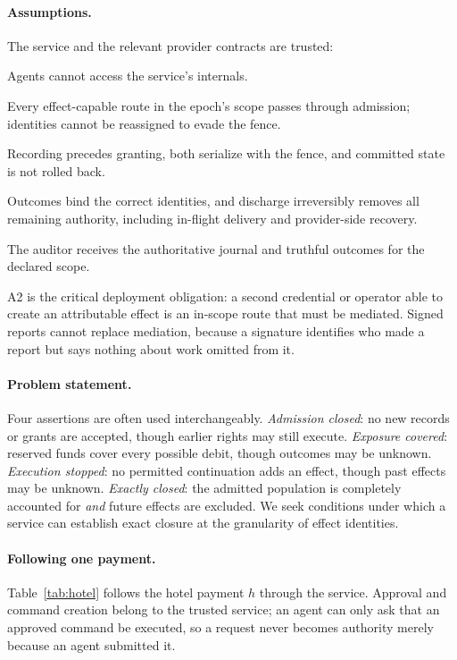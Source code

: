 \documentclass[runningheads]{llncs}
\begin{document}
\paragraph{Assumptions.}
The service and the relevant provider contracts are trusted:
\begin{description}[style=sameline,leftmargin=1.2em]
\item[A1 Request-only agents.] Agents cannot access the service's internals.
\item[A2 Complete mediation.] Every effect-capable route in the epoch's scope
passes through admission; identities cannot be reassigned to evade the fence.
\item[A3 Durable ordering.] Recording precedes granting, both serialize with the
fence, and committed state is not rolled back.
\item[A4 Truthful terminality.] Outcomes bind the correct identities, and
discharge irreversibly removes all remaining authority, including in-flight
delivery and provider-side recovery.
\item[A5 Faithful export.] The auditor receives the authoritative journal and
truthful outcomes for the declared scope.
\end{description}
A2 is the critical deployment obligation: a second credential or operator able
to create an attributable effect is an in-scope route that must be mediated.
Signed reports cannot replace mediation, because a signature identifies who
made a report but says nothing about work omitted from it.

\paragraph{Problem statement.}
Four assertions are often used interchangeably. \emph{Admission closed}: no new
records or grants are accepted, though earlier rights may still execute.
\emph{Exposure covered}: reserved funds cover every possible debit, though
outcomes may be unknown. \emph{Execution stopped}: no permitted continuation
adds an effect, though past effects may be unknown. \emph{Exactly closed}: the
admitted population is completely accounted for \emph{and} future effects are
excluded. We seek conditions under which a service can establish exact closure
at the granularity of effect identities.

\paragraph{Following one payment.}
Table~\ref{tab:hotel} follows the hotel payment $h$ through the service.
Approval and command creation belong to the trusted service; an agent can only
ask that an approved command be executed, so a request never becomes authority
merely because an agent submitted it.
\end{document}
